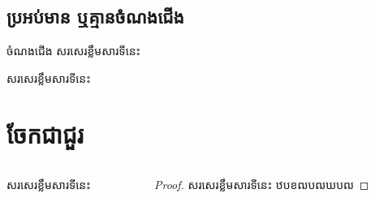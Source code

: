 \documentclass{beamer}
\begin{document}
\subsection{ប្រអប់មាន ឬគ្មានចំណងជើង}
\begin{frame}{\insertsubsection}
	\begin{block}{ចំណងជើង}
		សរសេរខ្លឹមសារទីនេះ
	\end{block}
%
	\begin{block}{}
		សរសេរខ្លឹមសារទីនេះ
	\end{block}
\end{frame}
%
\section{ចែកជាជួរ}
\begin{frame}{\insertsection}
\begin{columns}
%
	\begin{column}{0.47\textwidth}
		\begin{theorem}
			សរសេរខ្លឹមសារទីនេះ
		\end{theorem}
	\end{column}
%
	\begin{column}{0.47\textwidth}
		\begin{proof}
			សរសេរខ្លឹមសារទីនេះ
            ឋបខឍបឍឃបឍ
	\end{proof}
	\end{column}
\end{columns}
\end{frame}
%
\end{document}

